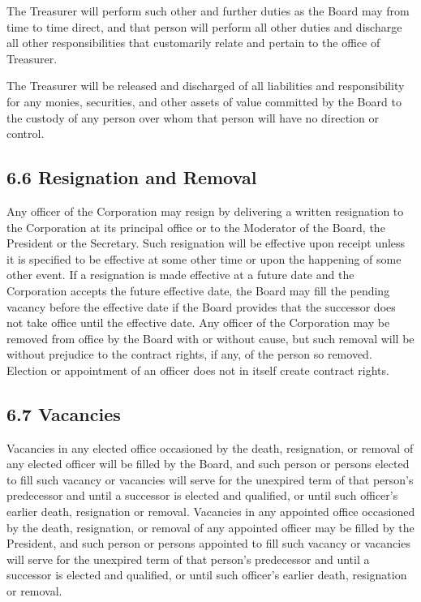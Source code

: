\documentclass[
]{book}
\begin{document}
The Treasurer will perform such other and further duties as the Board may from time to time direct, and that person will perform all other duties and discharge all other responsibilities that customarily relate and pertain to the office of Treasurer.

The Treasurer will be released and discharged of all liabilities and responsibility for any monies, securities, and other assets of value committed by the Board to the custody of any person over whom that person will have no direction or control.

\subsection*{6.6 Resignation and Removal}\label{resignation-and-removal}

Any officer of the Corporation may resign by delivering a written resignation to the Corporation at its principal office or to the Moderator of the Board, the President or the Secretary. Such resignation will be effective upon receipt unless it is specified to be effective at some other time or upon the happening of some other event. If a resignation is made effective at a future date and the Corporation accepts the future effective date, the Board may fill the pending vacancy before the effective date if the Board provides that the successor does not take office until the effective date. Any officer of the Corporation may be removed from office by the Board with or without cause, but such removal will be without prejudice to the contract rights, if any, of the person so removed. Election or appointment of an officer does not in itself create contract rights.

\subsection*{6.7 Vacancies}\label{vacancies}

Vacancies in any elected office occasioned by the death, resignation, or removal of any elected officer will be filled by the Board, and such person or persons elected to fill such vacancy or vacancies will serve for the unexpired term of that person's predecessor and until a successor is elected and qualified, or until such officer's earlier death, resignation or removal. Vacancies in any appointed office occasioned by the death, resignation, or removal of any appointed officer may be filled by the President, and such person or persons appointed to fill such vacancy or vacancies will serve for the unexpired term of that person's predecessor and until a successor is elected and qualified, or until such officer's earlier death, resignation or removal.
\end{document}
